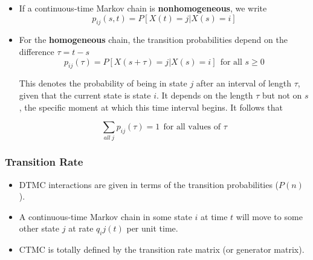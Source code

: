 \begin{frame}

        \begin{itemize}
            \item If a continuous-time Markov chain is \textbf{nonhomogeneous}, we write
            $$p_{ij}(s,t) = P[X(t)=j|X(s)=i]$$

            \item For the \textbf{homogeneous} chain, the transition probabilities depend on the difference $\tau=t-s$
            $$p_{ij}(\tau) = P[X(s+\tau)=j|X(s)=i]~~\text{for all $s\geq 0$}$$

            This denotes the probability of being in state $j$ after an interval of length $\tau$, given that the current 
            state is state $i$. It depends on the length $\tau$ but not on $s$, the specific moment at which this time
            interval begins. It follows that

            $$\sum_{all~j}p_{ij}(\tau) = 1~~\text{for all values of $\tau$}$$

        \end{itemize}
\end{frame}


\begin{frame}
        \frametitle{Transition Rate}

        \begin{itemize}
            \item DTMC interactions are given in terms of the transition probabilities ($P(n)$).

            \item A continuous-time Markov chain in some state $i$ at time $t$ will move to some 
            other state $j$ at rate $q_ij(t)$ per unit time.

            \item CTMC is totally defined by the transition rate matrix (or generator matrix). 
        \end{itemize}
\end{frame}


